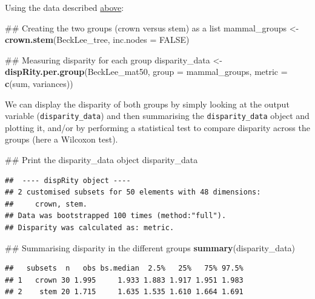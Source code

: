 \documentclass[]{book}
\newenvironment{Shaded}{\begin{snugshade}}{\end{snugshade}}
\newcommand{\KeywordTok}[1]{\textcolor[rgb]{0.13,0.29,0.53}{\textbf{#1}}}
\newcommand{\DataTypeTok}[1]{\textcolor[rgb]{0.13,0.29,0.53}{#1}}
\newcommand{\StringTok}[1]{\textcolor[rgb]{0.31,0.60,0.02}{#1}}
\newcommand{\OtherTok}[1]{\textcolor[rgb]{0.56,0.35,0.01}{#1}}
\newcommand{\NormalTok}[1]{#1}
\theoremstyle{definition}
\theoremstyle{definition}
\theoremstyle{remark}
\begin{document}
Using the \citet{beckancient2014} data described
\protect\hyperlink{example-data}{above}:

\begin{Shaded}
\begin{Highlighting}[]
\NormalTok{## Creating the two groups (crown versus stem) as a list}
\NormalTok{mammal_groups <-}\StringTok{ }\KeywordTok{crown.stem}\NormalTok{(BeckLee_tree, }\DataTypeTok{inc.nodes =} \OtherTok{FALSE}\NormalTok{)}

\NormalTok{## Measuring disparity for each group}
\NormalTok{disparity_data <-}\StringTok{ }\KeywordTok{dispRity.per.group}\NormalTok{(BeckLee_mat50, }\DataTypeTok{group =}\NormalTok{ mammal_groups,}
                                     \DataTypeTok{metric =} \KeywordTok{c}\NormalTok{(sum, variances))}
\end{Highlighting}
\end{Shaded}

We can display the disparity of both groups by simply looking at the
output variable (\texttt{disparity\_data}) and then summarising the
\texttt{disparity\_data} object and plotting it, and/or by performing a
statistical test to compare disparity across the groups (here a Wilcoxon
test).

\begin{Shaded}
\begin{Highlighting}[]
\NormalTok{## Print the disparity_data object}
\NormalTok{disparity_data}
\end{Highlighting}
\end{Shaded}

\begin{verbatim}
##  ---- dispRity object ---- 
## 2 customised subsets for 50 elements with 48 dimensions:
##     crown, stem.
## Data was bootstrapped 100 times (method:"full").
## Disparity was calculated as: metric.
\end{verbatim}

\begin{Shaded}
\begin{Highlighting}[]
\NormalTok{## Summarising disparity in the different groups}
\KeywordTok{summary}\NormalTok{(disparity_data)}
\end{Highlighting}
\end{Shaded}

\begin{verbatim}
##   subsets  n   obs bs.median  2.5%   25%   75% 97.5%
## 1   crown 30 1.995     1.933 1.883 1.917 1.951 1.983
## 2    stem 20 1.715     1.635 1.535 1.610 1.664 1.691
\end{verbatim}
\end{document}
